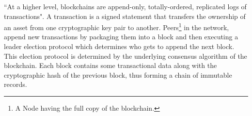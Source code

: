 	``At a higher level, blockchains are append-only, totally-ordered, replicated logs of transactions"\cite{bonneau2015research}. A transaction is a signed statement that transfers the ownership of an asset from one cryptographic key pair to another. Peers\footnote{A Node having the full copy of the blockchain.} in the network, append new transactions by packaging them into a block and then executing a leader election protocol which determines who gets to append the next block\cite{nelson2016extending}. This election protocol is determined by the underlying consensus algorithm of the blockchain. Each block contains some transactional data along with the cryptographic hash of the previous block, thus forming a chain of immutable records.